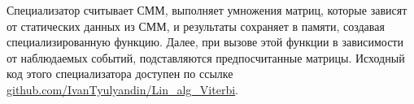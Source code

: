 Специализатор считывает СММ, выполняет умножения матриц, 
которые зависят от статических данных из СММ, и результаты 
сохраняет в памяти, создавая специализированную функцию.
Далее, при вызове этой функции в зависимости от наблюдаемых 
событий, подставляются предпосчитанные матрицы.
Исходный код этого специализатора доступен по ссылке 
\href{https://github.com/IvanTyulyandin/Lin_alg_Viterbi}
{github.com/IvanTyulyandin/Lin\_alg\_Viterbi}.